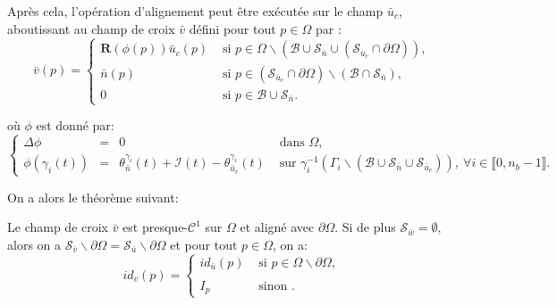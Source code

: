 Après cela, l'opération d'alignement peut être exécutée sur le champ $\bar{u}_c$, aboutissant au champ de croix $\bar{v}$ défini pour tout $p\in\Omega$ par :
\begin{equation}
\bar{v}(p)=
\left\{
\begin{array}{ll}
\mathbf{R}(\phi(p))\bar{u}_c(p) & \mbox{ si } p\in\Omega\backslash(\mathcal{B}\cup\mathcal{S}_{\bar{n}}\cup(\mathcal{S}_{\bar{u}_c}\cap\partial\Omega)),\\[0.5cm]
\bar{n}(p) & \mbox{ si } p\in(\mathcal{S}_{\bar{u}_c}\cap\partial\Omega)\backslash(\mathcal{B}\cap\mathcal{S}_{\bar{n}}),\\[0.5cm]
0 & \mbox{ si } p\in\mathcal{B}\cup\mathcal{S}_{\bar{n}}.
\end{array}
\right.
\label{eqn:etude_def_v_third}
\end{equation}

où $\phi$ est donné par:
\begin{equation}
\left\{
\begin{array}{lcll}
\Delta\phi &=& 0 &\mbox{ dans }\Omega,\\[0.5cm]
\phi(\gamma_i(t))&=&\theta_{\bar{n}}^{\gamma_i}(t)+\mathcal{I}(t)-\theta_{\bar{u}_c}^{\gamma_i}(t) & \mbox{ sur } \gamma_i^{-1}(\Gamma_i\backslash(\mathcal{B}\cup\mathcal{S}_{\bar{n}}\cup\mathcal{S}_{\bar{u}_c})),~\forall i\in\llbracket 0, n_b-1\rrbracket.
\end{array}
\right.
\label{eqn:etude_def_phi_third}
\end{equation}

On a alors le théorème suivant:
\begin{theorem}
\label{thm:theorem4}
Le champ de croix $\bar{v}$ est presque-$\mathcal{C}^1$ sur $\Omega$ et aligné avec $\partial\Omega$. Si de plus $\mathcal{S}_{\bar{w}}=\emptyset$, alors on a $\mathcal{S}_{\bar{v}}\backslash\partial\Omega=\mathcal{S}_{\bar{u}}\backslash\partial\Omega$ et pour tout $p\in\Omega$, on a:
\begin{equation}
id_{\bar{v}}(p)=
\left\{
\begin{array}{ll}
    id_{\bar{u}}(p) & \mbox{ si } p\in\Omega\backslash\partial\Omega,\\\\
    I_p & \mbox{ sinon }.
\end{array}
\right.
\end{equation}
\end{theorem}

